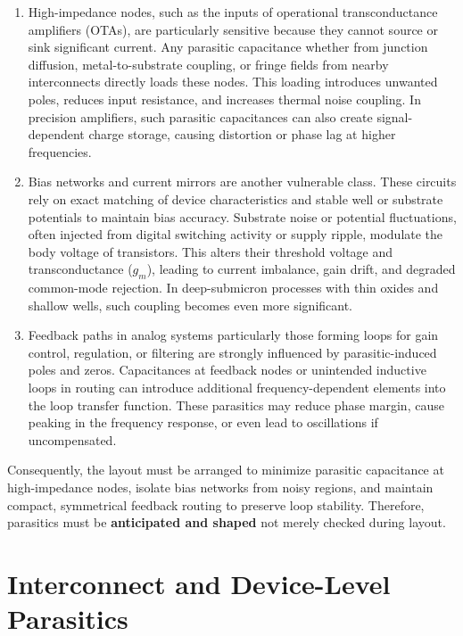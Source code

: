 \documentclass[
  11pt,
  a4paper,
  oneside]{scrbook}
\begin{document}
\begin{enumerate}
\def\labelenumi{\arabic{enumi}.}
\item
  High-impedance nodes, such as the inputs of operational
  transconductance amplifiers (OTAs), are particularly sensitive because
  they cannot source or sink significant current. Any parasitic
  capacitance whether from junction diffusion, metal-to-substrate
  coupling, or fringe fields from nearby interconnects directly loads
  these nodes. This loading introduces unwanted poles, reduces input
  resistance, and increases thermal noise coupling. In precision
  amplifiers, such parasitic capacitances can also create
  signal-dependent charge storage, causing distortion or phase lag at
  higher frequencies.
\item
  Bias networks and current mirrors are another vulnerable class. These
  circuits rely on exact matching of device characteristics and stable
  well or substrate potentials to maintain bias accuracy. Substrate
  noise or potential fluctuations, often injected from digital switching
  activity or supply ripple, modulate the body voltage of transistors.
  This alters their threshold voltage and transconductance (\(g_m\)),
  leading to current imbalance, gain drift, and degraded common-mode
  rejection. In deep-submicron processes with thin oxides and shallow
  wells, such coupling becomes even more significant.
\item
  Feedback paths in analog systems particularly those forming loops for
  gain control, regulation, or filtering are strongly influenced by
  parasitic-induced poles and zeros. Capacitances at feedback nodes or
  unintended inductive loops in routing can introduce additional
  frequency-dependent elements into the loop transfer function. These
  parasitics may reduce phase margin, cause peaking in the frequency
  response, or even lead to oscillations if uncompensated.
\end{enumerate}

Consequently, the layout must be arranged to minimize parasitic
capacitance at high-impedance nodes, isolate bias networks from noisy
regions, and maintain compact, symmetrical feedback routing to preserve
loop stability. Therefore, parasitics must be \textbf{anticipated and
shaped} not merely checked during layout.

\section{Interconnect and Device-Level
Parasitics}\label{interconnect-and-device-level-parasitics}
\end{document}
